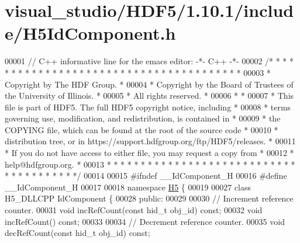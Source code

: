 \hypertarget{visual__studio_2_h_d_f5_21_810_81_2include_2_h5_id_component_8h_source}{}\section{visual\+\_\+studio/\+H\+D\+F5/1.10.1/include/\+H5\+Id\+Component.h}
\label{visual__studio_2_h_d_f5_21_810_81_2include_2_h5_id_component_8h_source}

\begin{DoxyCode}
00001 \textcolor{comment}{// C++ informative line for the emacs editor: -*- C++ -*-}
00002 \textcolor{comment}{/* * * * * * * * * * * * * * * * * * * * * * * * * * * * * * * * * * * * * * *}
00003 \textcolor{comment}{ * Copyright by The HDF Group.                                               *}
00004 \textcolor{comment}{ * Copyright by the Board of Trustees of the University of Illinois.         *}
00005 \textcolor{comment}{ * All rights reserved.                                                      *}
00006 \textcolor{comment}{ *                                                                           *}
00007 \textcolor{comment}{ * This file is part of HDF5.  The full HDF5 copyright notice, including     *}
00008 \textcolor{comment}{ * terms governing use, modification, and redistribution, is contained in    *}
00009 \textcolor{comment}{ * the COPYING file, which can be found at the root of the source code       *}
00010 \textcolor{comment}{ * distribution tree, or in https://support.hdfgroup.org/ftp/HDF5/releases.  *}
00011 \textcolor{comment}{ * If you do not have access to either file, you may request a copy from     *}
00012 \textcolor{comment}{ * help@hdfgroup.org.                                                        *}
00013 \textcolor{comment}{ * * * * * * * * * * * * * * * * * * * * * * * * * * * * * * * * * * * * * * */}
00014 
00015 \textcolor{preprocessor}{#ifndef \_\_IdComponent\_H}
00016 \textcolor{preprocessor}{#define \_\_IdComponent\_H}
00017 
00018 \textcolor{keyword}{namespace }\hyperlink{namespace_h5}{H5} \{
00019 
00027 \textcolor{keyword}{class }H5\_DLLCPP IdComponent \{
00028     \textcolor{keyword}{public}:
00029 
00030         \textcolor{comment}{// Increment reference counter.}
00031         \textcolor{keywordtype}{void} incRefCount(\textcolor{keyword}{const} hid\_t obj\_id) \textcolor{keyword}{const};
00032         \textcolor{keywordtype}{void} incRefCount() \textcolor{keyword}{const};
00033 
00034         \textcolor{comment}{// Decrement reference counter.}
00035         \textcolor{keywordtype}{void} decRefCount(\textcolor{keyword}{const} hid\_t obj\_id) \textcolor{keyword}{const};

\end{DoxyCode}
